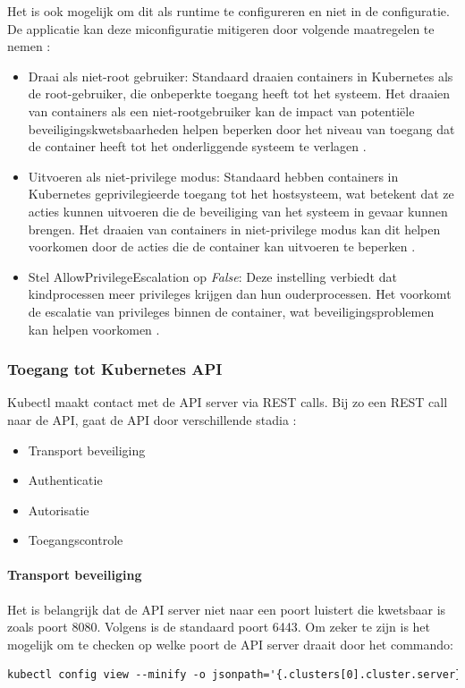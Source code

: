 Het is ook mogelijk om dit als runtime te configureren en niet in de configuratie. De applicatie kan deze miconfiguratie mitigeren door volgende maatregelen te nemen \autocite{OWASP-2023}:
\begin{itemize}
    \item Draai als niet-root gebruiker: Standaard draaien containers in Kubernetes als de root-gebruiker, die onbeperkte toegang heeft tot het systeem. Het draaien van containers als een niet-rootgebruiker kan de impact van potentiële beveiligingskwetsbaarheden helpen beperken door het niveau van toegang dat de container heeft tot het onderliggende systeem te verlagen \autocite{OWASP-2023}.
    \item Uitvoeren als niet-privilege modus: Standaard hebben containers in Kubernetes geprivilegieerde toegang tot het hostsysteem, wat betekent dat ze acties kunnen uitvoeren die de beveiliging van het systeem in gevaar kunnen brengen. Het draaien van containers in niet-privilege modus kan dit helpen voorkomen door de acties die de container kan uitvoeren te beperken \autocite{OWASP-2023}.
    \item Stel AllowPrivilegeEscalation op \textit{False}: Deze instelling verbiedt dat kindprocessen meer privileges krijgen dan hun ouderprocessen. Het voorkomt de escalatie van privileges binnen de container, wat beveiligingsproblemen kan helpen voorkomen \autocite{OWASP-2023}.
\end{itemize}

\subsubsection{Toegang tot Kubernetes API}
Kubectl maakt contact met de API server via REST calls. Bij zo een REST call naar de API, gaat de API door verschillende stadia \autocite{KubernetesDocs-2023}: 
\begin{itemize}
    \item Transport beveiliging
    \item Authenticatie
    \item Autorisatie
    \item Toegangscontrole
\end{itemize}
\paragraph{Transport beveiliging}
Het is belangrijk dat de API server niet naar een poort luistert die kwetsbaar is zoals poort 8080. Volgens \autocite{KubernetesDocs-2023} is de standaard poort 6443. Om zeker te zijn is het mogelijk om te checken op welke poort de API server draait door het commando:
\begin{lstlisting}[language=tex, caption={Checken welke poort de API server draait}]
kubectl config view --minify -o jsonpath='{.clusters[0].cluster.server}'
\end{lstlisting}

